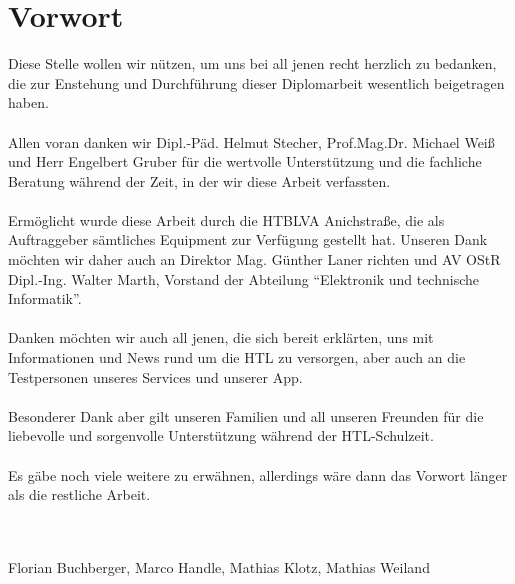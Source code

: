 \chapter{Vorwort}


Diese Stelle wollen wir nützen, um uns bei all jenen recht herzlich zu bedanken, die zur Enstehung und Durchführung dieser Diplomarbeit wesentlich beigetragen haben.\\
\\
Allen voran danken wir Dipl.-Päd. Helmut Stecher, Prof.Mag.Dr. Michael Weiß und Herr Engelbert Gruber für die wertvolle Unterstützung und die fachliche Beratung während der Zeit, in der wir diese Arbeit verfassten.\\
\\
Ermöglicht wurde diese Arbeit durch die HTBLVA Anichstraße, die als Auftraggeber sämtliches Equipment zur Verfügung gestellt hat. Unseren Dank möchten wir daher auch an Direktor Mag. Günther Laner richten und AV OStR Dipl.-Ing. Walter Marth, Vorstand der Abteilung \enquote{Elektronik und technische Informatik}.\\
\\
Danken möchten wir auch all jenen, die sich bereit erklärten, uns mit Informationen und News rund um die HTL zu versorgen, aber auch an die Testpersonen unseres Services und unserer App.\\
\\
Besonderer Dank aber gilt unseren Familien und all unseren Freunden für die liebevolle und sorgenvolle Unterstützung während der HTL-Schulzeit.\\
\\
Es gäbe noch viele weitere zu erwähnen, allerdings wäre dann das Vorwort länger als die restliche Arbeit.\\
\\
\\
\begin{flushright}
Florian Buchberger, Marco Handle, Mathias Klotz, Mathias Weiland
\end{flushright}